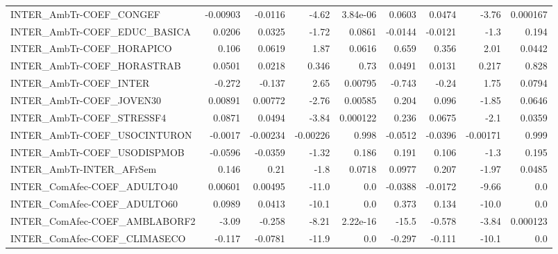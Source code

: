\begin{tabular}{lrrrrrrrr}
INTER\_AmbTr-COEF\_CONGEF               &    -0.00903 &      -0.0116 &    -4.62 & 3.84e-06 &     0.0603 &      0.0474 &        -3.76 &      0.000167 \\
INTER\_AmbTr-COEF\_EDUC\_BASICA          &      0.0206 &       0.0325 &    -1.72 &   0.0861 &    -0.0144 &     -0.0121 &         -1.3 &         0.194 \\
INTER\_AmbTr-COEF\_HORAPICO             &       0.106 &       0.0619 &     1.87 &   0.0616 &      0.659 &       0.356 &         2.01 &        0.0442 \\
INTER\_AmbTr-COEF\_HORASTRAB            &      0.0501 &       0.0218 &    0.346 &     0.73 &     0.0491 &      0.0131 &        0.217 &         0.828 \\
INTER\_AmbTr-COEF\_INTER                &      -0.272 &       -0.137 &     2.65 &  0.00795 &     -0.743 &       -0.24 &         1.75 &        0.0794 \\
INTER\_AmbTr-COEF\_JOVEN30              &     0.00891 &      0.00772 &    -2.76 &  0.00585 &      0.204 &       0.096 &        -1.85 &        0.0646 \\
INTER\_AmbTr-COEF\_STRESSF4             &      0.0871 &       0.0494 &    -3.84 & 0.000122 &      0.236 &      0.0675 &         -2.1 &        0.0359 \\
INTER\_AmbTr-COEF\_USOCINTURON          &     -0.0017 &     -0.00234 & -0.00226 &    0.998 &    -0.0512 &     -0.0396 &     -0.00171 &         0.999 \\
INTER\_AmbTr-COEF\_USODISPMOB           &     -0.0596 &      -0.0359 &    -1.32 &    0.186 &      0.191 &       0.106 &         -1.3 &         0.195 \\
INTER\_AmbTr-INTER\_AFrSem              &       0.146 &         0.21 &     -1.8 &   0.0718 &     0.0977 &       0.207 &        -1.97 &        0.0485 \\
INTER\_ComAfec-COEF\_ADULTO40           &     0.00601 &      0.00495 &    -11.0 &      0.0 &    -0.0388 &     -0.0172 &        -9.66 &           0.0 \\
INTER\_ComAfec-COEF\_ADULTO60           &      0.0989 &       0.0413 &    -10.1 &      0.0 &      0.373 &       0.134 &        -10.0 &           0.0 \\
INTER\_ComAfec-COEF\_AMBLABORF2         &       -3.09 &       -0.258 &    -8.21 & 2.22e-16 &      -15.5 &      -0.578 &        -3.84 &      0.000123 \\
INTER\_ComAfec-COEF\_CLIMASECO          &      -0.117 &      -0.0781 &    -11.9 &      0.0 &     -0.297 &      -0.111 &        -10.1 &           0.0 \\

\end{tabular}

